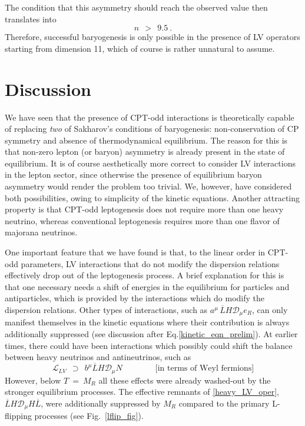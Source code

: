 \documentclass[12pt]{revtex4}
\newcommand{\md}{\mathcal{D}}
\newcommand{\ov}{\overline}
\begin{document}
	The condition that this asymmetry should reach the observed value then translates
	into
\[
	n~~>~~9.5~.
\]
	Therefore, successful baryogenesis is only possible in the presence of LV operators
	starting from dimension 11, which of course is rather 
	unnatural to assume.


%
%
\section{Discussion}

	We have seen that the presence of CPT-odd interactions is theoretically capable
	of replacing \emph{two} of Sakharov's conditions of baryogenesis: non-conservation 
	of CP symmetry and absence of thermodynamical equilibrium. 
	The reason for this is that non-zero lepton (or baryon) asymmetry is already present 
	in the state of equilibrium.
	It is of course aesthetically more correct to consider LV interactions in the 
	lepton sector,
	since otherwise the presence of equilibrium baryon asymmetry would render the 
	problem too trivial.
	We, however, have considered both possibilities, owing to  simplicity of the kinetic
	equations.
	Another attracting property is that CPT-odd leptogenesis does not require more than
	one heavy neutrino, whereas conventional leptogenesis requires more than one flavor
	of majorana neutrinos.

	One important feature that we have found is that, to the linear order in CPT-odd 
	parameters, LV interactions that do not modify the dispersion relations effectively 
	drop out of the leptogenesis process.
	A brief explanation for this is that one necessary needs a shift of energies
	in the equilibrium for particles and antiparticles, which is provided by the 
	interactions which do modify the dispersion relations. 
	Other types of interactions, such as $ a^\mu\, \ov{L}H \md_\mu e_R $,
	can only manifest themselves in the kinetic equations where their contribution
	is always additionally suppressed 
	(see discussion after Eq.\eqref{kinetic_eqn_prelim}).
	At earlier times, there could have been interactions which possibly could 
	shift the balance between heavy neutrinos and antineutrinos, such as 
\begin{equation}
\label{heavy_LV_oper}
	\mathcal{L}_{LV} ~~\supset~~
	 b^\mu \ov{L} H \md_\mu N \qquad\qquad \text{[in terms of Weyl fermions]}
\end{equation}
	However, below $ T ~=~ M_R $ all these effects
	were already washed-out by the stronger equilibrium processes.
	The effective remnants of \eqref{heavy_LV_oper}, $ \ov{L}H \md_\mu H \ov{L} $, 
	were additionally suppressed by $ M_R $ compared to the primary L-flipping processes
	(see Fig.~\ref{lflip_fig}).
	
\end{document}

